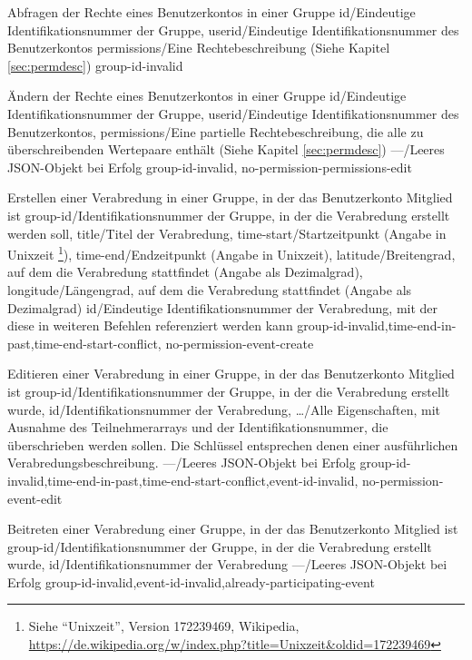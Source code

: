 \documentclass[parskip=full,11pt]{scrartcl}
\begin{document}
{Abfragen der Rechte eines Benutzerkontos in einer Gruppe}
{id/Eindeutige Identifikationsnummer der Gruppe,
userid/Eindeutige Identifikationsnummer des Benutzerkontos}
{permissions/Eine Rechtebeschreibung (Siehe Kapitel \ref{sec:permdesc})}
{group-id-invalid}

{Ändern der Rechte eines Benutzerkontos in einer Gruppe}
{id/Eindeutige Identifikationsnummer der Gruppe,
userid/Eindeutige Identifikationsnummer des Benutzerkontos,
permissions/Eine partielle Rechtebeschreibung{,} die alle zu überschreibenden
Wertepaare enthält (Siehe Kapitel \ref{sec:permdesc})}
{---/Leeres JSON-Objekt bei Erfolg}
{group-id-invalid, no-permission-permissions-edit}

{Erstellen einer Verabredung in einer Gruppe, in der das Benutzerkonto Mitglied
ist}
{group-id/Identifikationsnummer der Gruppe{,} in der die Verabredung erstellt
werden soll,
title/Titel der Verabredung,
time-start/Startzeitpunkt (Angabe in Unixzeit%
\footnote{Siehe \enquote{Unixzeit}, Version 172239469, Wikipedia,\\
\url{https://de.wikipedia.org/w/index.php?title=Unixzeit&oldid=172239469}}),
time-end/Endzeitpunkt (Angabe in Unixzeit),
latitude/Breitengrad{,} auf dem die Verabredung stattfindet (Angabe als
Dezimalgrad),
longitude/Längengrad{,} auf dem die Verabredung stattfindet (Angabe als
Dezimalgrad)}
{id/Eindeutige Identifikationsnummer der Verabredung{,} mit der diese in
weiteren Befehlen referenziert werden kann}
{group-id-invalid,time-end-in-past,time-end-start-conflict,
no-permission-event-create}

{Editieren einer Verabredung in einer Gruppe, in der das Benutzerkonto Mitglied
ist}
{group-id/Identifikationsnummer der Gruppe{,} in der die Verabredung erstellt
wurde,
id/Identifikationsnummer der Verabredung,
\dots/Alle Eigenschaften{,} mit Ausnahme des Teilnehmerarrays und der
Identifikationsnummer{,} die überschrieben werden sollen.
Die Schlüssel entsprechen denen einer ausführlichen Verabredungsbeschreibung.}
{---/Leeres JSON-Objekt bei Erfolg}
{group-id-invalid,time-end-in-past,time-end-start-conflict,event-id-invalid,
no-permission-event-edit}

{Beitreten einer Verabredung einer Gruppe, in der das Benutzerkonto Mitglied
ist}
{group-id/Identifikationsnummer der Gruppe{,} in der die Verabredung erstellt
wurde,
id/Identifikationsnummer der Verabredung}
{---/Leeres JSON-Objekt bei Erfolg}
{group-id-invalid,event-id-invalid,already-participating-event}
\end{document}
